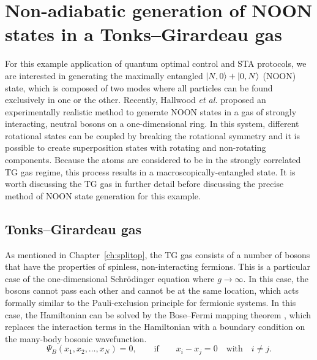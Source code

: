 \section{Non-adiabatic generation of NOON states in a Tonks--Girardeau gas}

For this example application of quantum optimal control and STA protocols, we are interested in generating the maximally entangled $\ket{N,0} + \ket{0,N}$ (NOON) state, which is composed of two modes where all particles can be found exclusively in one or the other.
Recently, Hallwood \textit{et al.} proposed an experimentally realistic method to generate NOON states in a gas of strongly interacting, neutral bosons on a one-dimensional ring.
In this system, different rotational states can be coupled by breaking the rotational symmetry and it is possible to create superposition states with rotating and non-rotating components.
Because the atoms are considered to be in the strongly correlated TG gas regime, this process results in a macroscopically-entangled state.
It is worth discussing the TG gas in further detail before discussing the precise method of NOON state generation for this example.

\subsection{Tonks--Girardeau gas}

As mentioned in Chapter~\ref{ch:splitop}, the TG gas consists of a number of bosons that have the properties of spinless, non-interacting fermions.
This is a particular case of the one-dimensional Schr\"odinger equation where $g\rightarrow\infty$.
In this case, the bosons cannot pass each other and cannot be at the same location, which acts formally similar to the Pauli-exclusion principle for fermionic systems.
In this case, the Hamiltonian can be solved by the Bose--Fermi mapping theorem \cite{girardeau2001ground, girardeau2001measurement}, which replaces the interaction terms in the Hamiltonian with a boundary condition on the many-body bosonic wavefunction.
\begin{equation}
\Psi_B(x_1, x_2, \ldots, x_N) = 0,\qquad \mathrm{if}\qquad x_i - x_j = 0 \quad\textrm{with}\quad i \ne j.
\end{equation}

